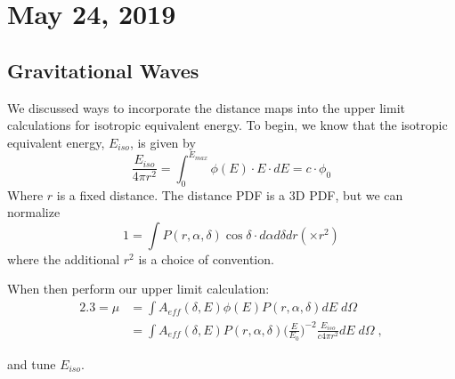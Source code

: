 \chapter{May 24, 2019}

\section{Gravitational Waves}

We discussed ways to incorporate the distance maps into the upper limit calculations for isotropic equivalent energy. To begin, we know that the isotropic equivalent energy, $E_{iso}$, is given by \begin{equation}
    \frac{E_{iso}}{4 \pi r^2} = \int_0^{E_{max}} \phi(E) \cdot E \cdot dE = c\cdot \phi_0
\end{equation}
Where $r$ is a fixed distance. The distance PDF is a 3D PDF, but we can normalize 
\begin{equation}
    1 = \int P(r, \alpha, \delta) \cos\delta \cdot d\alpha d\delta dr (\times r^2)
\end{equation}
where the additional $r^2$ is a choice of convention. 

When then perform our upper limit calculation:
\begin{align*}
    2.3 = \mu &= \int A_{eff}(\delta, E) \phi(E) P(r, \alpha, \delta) dE \; d\Omega \\
    &= \int  A_{eff}(\delta, E) P(r, \alpha, \delta) \Big(\frac{E}{E_0}\Big)^{-2} \frac{E_{iso}}{c 4\pi r^2} dE \; d\Omega \; ,
\end{align*} 

and tune $E_{iso}$.